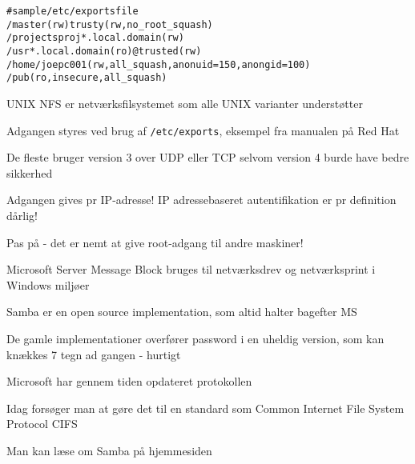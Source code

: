
\begin{alltt}
 # sample /etc/exports file
 /               master(rw) trusty(rw,no_root_squash)
 /projects       proj*.local.domain(rw)
 /usr            *.local.domain(ro) @trusted(rw)
 /home/joe       pc001(rw,all_squash,anonuid=150,anongid=100)
 /pub            (ro,insecure,all_squash)  
\end{alltt}

\begin{list2}
\item UNIX NFS er netværksfilsystemet som alle UNIX varianter understøtter
\item Adgangen styres ved brug af \verb+/etc/exports+, eksempel fra
  manualen på Red Hat
\item De fleste bruger version 3 over UDP eller TCP selvom version 4
  burde have bedre sikkerhed 
\item Adgangen gives pr IP-adresse! IP adressebaseret autentifikation
  er pr definition dårlig!
\item Pas på - det er nemt at give root-adgang til andre maskiner!
\end{list2}



\begin{list1}
\item Microsoft Server Message Block bruges til netværksdrev og netværksprint i Windows miljøer
\item Samba er en open source implementation, som altid halter bagefter MS
\item De gamle implementationer overfører password i en uheldig version, som kan knækkes 7 tegn ad gangen - hurtigt
\item Microsoft har gennem tiden opdateret protokollen
\item Idag forsøger man at gøre det til en standard som Common Internet File System Protocol CIFS
\item Man kan læse om Samba på hjemmesiden 
\end{list1}

